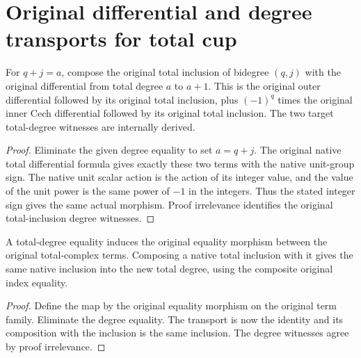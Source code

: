 \section{Original differential and degree transports for total cup}

\begin{theorem}
\label{thm:di-cech-total-inclusion-differential}
\leanok
{}
For $q+j=a$, compose the original total inclusion of bidegree
$(q,j)$ with the original differential from total degree $a$ to
$a+1$. This is the original outer differential followed by its
original total inclusion, plus $(-1)^q$ times the original inner
Cech differential followed by its original total inclusion.
The two target total-degree witnesses are internally derived.
\end{theorem}
\begin{proof}
\leanok
Eliminate the given degree equality to set $a=q+j$. The original
native total differential formula gives exactly these two terms
with the native unit-group sign. The native unit scalar action is
the action of its integer value, and the value of the unit power
is the same power of $-1$ in the integers. Thus the stated integer
sign gives the same actual morphism. Proof irrelevance identifies
the original total-inclusion degree witnesses.
\end{proof}

\begin{definition}
\label{def:di-cech-total-degree-map}
\leanok
{}
A total-degree equality induces the original equality morphism
between the original total-complex terms. Composing a native total
inclusion with it gives the same native inclusion into the new
total degree, using the composite original index equality.
\end{definition}
\begin{proof}
\leanok
Define the map by the original equality morphism on the original
term family. Eliminate the degree equality. The transport is now
the identity and its composition with the inclusion is the same
inclusion. The degree witnesses agree by proof irrelevance.
\end{proof}

